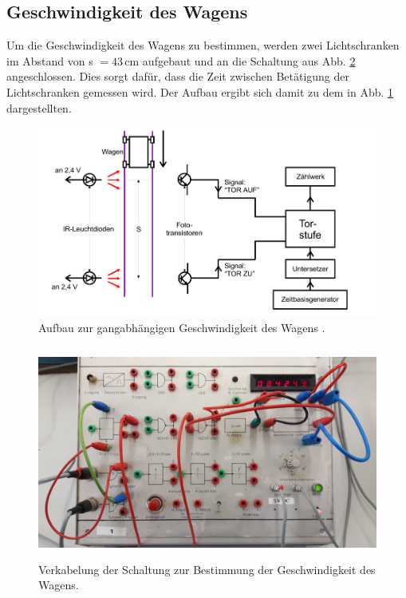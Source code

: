 \subsection{Geschwindigkeit des Wagens}
\label{sec:Geschwindigkeit}
Um die Geschwindigkeit des Wagens zu bestimmen, werden zwei Lichtschranken im
Abstand von s $=43\,$cm aufgebaut und an die Schaltung aus Abb.
\ref{fig:Geschwindigkeit-Schaltung} angeschlossen. Dies sorgt dafür,
dass die Zeit zwischen Betätigung der Lichtschranken gemessen wird.
Der Aufbau ergibt sich damit zu dem in Abb. \ref{fig:Geschwindigkeit}
dargestellten.
\begin{figure}
  \centering
  \includegraphics[width = \textwidth]{./Abbildungen/Geschwindigkeit.PNG}
  \caption{Aufbau zur gangabhängigen Geschwindigkeit des Wagens \cite{Anleitung}.}
  \label{fig:Geschwindigkeit}
\end{figure}
\begin{figure}
  \centering
  \includegraphics[height = 7cm]{./Abbildungen/Geschwindigkeit-Schaltung.jpg}
  \caption{Verkabelung der Schaltung zur Bestimmung der Geschwindigkeit des Wagens.}
  \label{fig:Geschwindigkeit-Schaltung}
\end{figure}

